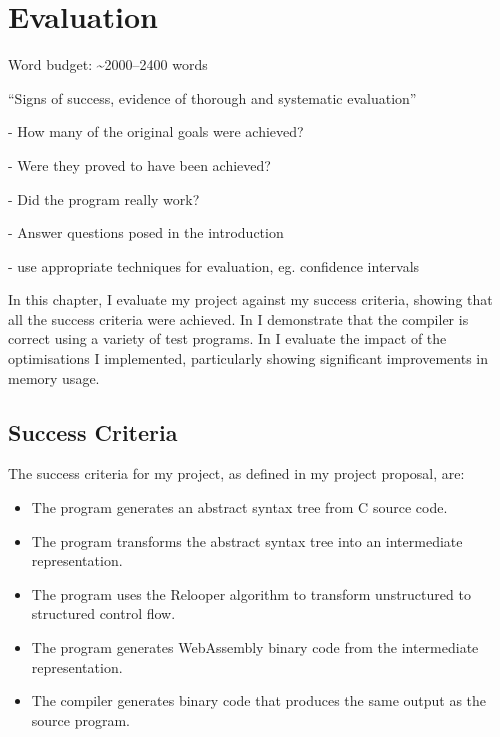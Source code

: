 \documentclass[00-main.tex]{subfiles}
\begin{document}
\chapter{Evaluation}

\newcommand{\IncludeStackPlot}[1]{\resizebox{0.98\textwidth}{!}{}}

\begin{Comment}
Word budget: \textasciitilde 2000--2400 words
\end{Comment}

\begin{Comment}
``Signs of success, evidence of thorough and systematic evaluation''

- How many of the original goals were achieved?

- Were they proved to have been achieved?

- Did the program really work?

- Answer questions posed in the introduction

- use appropriate techniques for evaluation, eg. confidence intervals
\end{Comment}


In this chapter, I evaluate my project against my success criteria, showing that all the success criteria were achieved.
In  I demonstrate that the compiler is correct using a variety of test programs.
In  I evaluate the impact of the optimisations I implemented, particularly showing significant improvements in memory usage.


\section{Success Criteria}

The success criteria for my project, as defined in my project proposal, are:
\begin{itemize}
\item The program generates an abstract syntax tree from C source code.
\item The program transforms the abstract syntax tree into an intermediate representation.
\item The program uses the Relooper algorithm to transform unstructured to structured control
flow.
\item The program generates WebAssembly binary code from the intermediate representation.
\item The compiler generates binary code that produces the same output as the source program.
\end{itemize}
\end{document}
